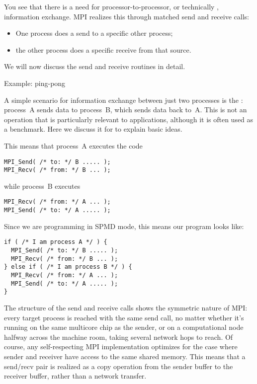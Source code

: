 You see that there is a need for processor-to-processor, or
technically , information exchange.
MPI realizes this through matched send and receive calls:
\begin{itemize}
\item One process does a send to a specific other process;
\item the other process does a specific receive from that source.
\end{itemize}

We will now discuss the send and receive routines in detail.

 {Example: ping-pong}
\label{sec:mpi-send-recv}

A simple scenario for information exchange between just two processes
is the : process~A sends data to process~B, which
sends data back to~A.
This is not an operation that is particularly relevant to applications,
although it is often used as a benchmark.
Here we discuss it for to explain basic ideas.

This means that process~A executes the code
\begin{lstlisting}
MPI_Send( /* to: */ B ..... );
MPI_Recv( /* from: */ B ... );
\end{lstlisting}
while process~B executes
\begin{lstlisting}
MPI_Recv( /* from: */ A ... );
MPI_Send( /* to: */ A ..... );
\end{lstlisting}
Since we are programming in SPMD mode, this means our program looks like:
\begin{lstlisting}
if ( /* I am process A */ ) {
  MPI_Send( /* to: */ B ..... );
  MPI_Recv( /* from: */ B ... );
} else if ( /* I am process B */ ) {
  MPI_Recv( /* from: */ A ... );
  MPI_Send( /* to: */ A ..... );
}
\end{lstlisting}

\begin{remark}
  The structure of the send and receive calls shows the symmetric nature of MPI: every
  target process is reached with the same send call, no matter whether it's
  running on the same multicore chip as the sender, or on a
  computational node halfway across the machine room, taking
  several network hops to reach. Of course, any
  self-respecting MPI implementation optimizes for the case where sender
  and receiver have access to the same shared memory.
  This means that a send/recv pair is realized as
  a copy operation from the sender buffer to the
  receiver buffer, rather than a network transfer.
\end{remark}

